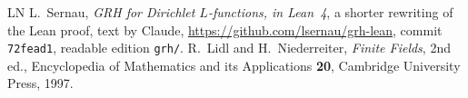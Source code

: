\documentclass[reqno]{amsart}
\theoremstyle{definition}
\theoremstyle{plain}
\theoremstyle{remark}
\begin{document}
\begin{thebibliography}{LN}
 L.~Sernau, \emph{GRH for Dirichlet \(L\)-functions, in Lean~4}, a shorter rewriting of the Lean proof, text by Claude, \url{https://github.com/lsernau/grh-lean}, commit \texttt{72fead1}, readable edition \texttt{grh/}.
 R.~Lidl and H.~Niederreiter, \emph{Finite Fields}, 2nd ed., Encyclopedia of Mathematics and its Applications \textbf{20}, Cambridge University Press, 1997.
\end{thebibliography}
\end{document}
